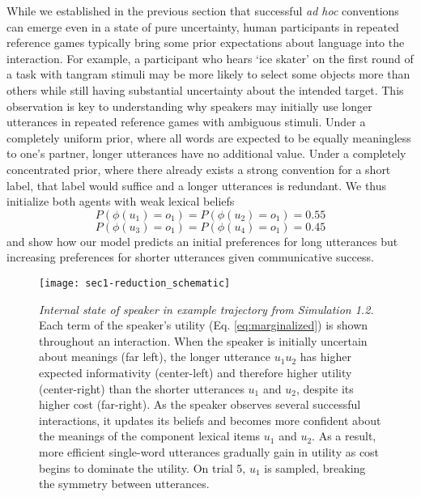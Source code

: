 While we established in the previous section that successful \emph{ad hoc} conventions can emerge even in a state of pure uncertainty, human participants in repeated reference games typically bring some prior expectations about language into the interaction.
For example, a participant who hears `ice skater' on the first round of a task with tangram stimuli may be more likely to select some objects more than others while still having substantial uncertainty about the intended target.
This observation is key to understanding why speakers may initially use longer utterances in repeated reference games with ambiguous stimuli. 
Under a completely uniform prior, where all words are expected to be equally meaningless to one's partner, longer utterances have no additional value. 
Under a completely concentrated prior, where there already exists a strong convention for a short label, that label would suffice and a longer utterances is redundant.
We thus initialize both agents with weak lexical beliefs
$$P(\phi(u_1) = o_1) = P(\phi(u_2) = o_1) = 0.55$$ 
$$P(\phi(u_3) = o_1) = P(\phi(u_4) = o_1) = 0.45$$
and show how our model predicts an initial preferences for long utterances but increasing preferences for shorter utterances given communicative success.



\begin{figure*}[t]
\centering
    \texttt{[image: sec1-reduction\_schematic]}
    \vspace{1em}
  \caption{\emph{Internal state of speaker in example trajectory from Simulation 1.2.} Each term of the speaker's utility (Eq. \ref{eq:marginalized}) is shown throughout an interaction. When the speaker is initially uncertain about meanings (far left), the longer utterance $u_1u_2$ has higher expected informativity (center-left) and therefore higher utility (center-right) than the shorter utterances $u_1$ and $u_2$, despite its higher cost (far-right). As the speaker observes several successful interactions, it updates its beliefs and becomes more confident about the meanings of the component lexical items $u_1$ and $u_2$. As a result, more efficient single-word utterances gradually gain in utility as cost begins to dominate the utility. On trial 5, $u_1$ is sampled, breaking the symmetry between utterances.}
  \label{fig:sec1internals}
\end{figure*}

